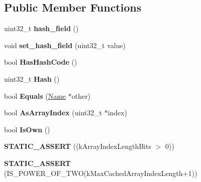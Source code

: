 \subsection*{Public Member Functions}
\begin{DoxyCompactItemize}
\item 
\hypertarget{classv8_1_1internal_1_1_name_ad61608b54af5cb01c5397ad55d911907}{}uint32\+\_\+t {\bfseries hash\+\_\+field} ()\label{classv8_1_1internal_1_1_name_ad61608b54af5cb01c5397ad55d911907}

\item 
\hypertarget{classv8_1_1internal_1_1_name_a7143969e09bd27e1f6a60d50258686dd}{}void {\bfseries set\+\_\+hash\+\_\+field} (uint32\+\_\+t value)\label{classv8_1_1internal_1_1_name_a7143969e09bd27e1f6a60d50258686dd}

\item 
\hypertarget{classv8_1_1internal_1_1_name_a2eee1d6ca54d3b718897f4de1249f1dd}{}bool {\bfseries Has\+Hash\+Code} ()\label{classv8_1_1internal_1_1_name_a2eee1d6ca54d3b718897f4de1249f1dd}

\item 
\hypertarget{classv8_1_1internal_1_1_name_a04a7a8b928966e664ad5788210327e36}{}uint32\+\_\+t {\bfseries Hash} ()\label{classv8_1_1internal_1_1_name_a04a7a8b928966e664ad5788210327e36}

\item 
\hypertarget{classv8_1_1internal_1_1_name_aa375654cad6d51ae37d9ae5b5b358899}{}bool {\bfseries Equals} (\hyperlink{classv8_1_1internal_1_1_name}{Name} $\ast$other)\label{classv8_1_1internal_1_1_name_aa375654cad6d51ae37d9ae5b5b358899}

\item 
\hypertarget{classv8_1_1internal_1_1_name_aafe9fecb286ed29037aecd56eb3f3124}{}bool {\bfseries As\+Array\+Index} (uint32\+\_\+t $\ast$index)\label{classv8_1_1internal_1_1_name_aafe9fecb286ed29037aecd56eb3f3124}

\item 
\hypertarget{classv8_1_1internal_1_1_name_a79a0206aecdc1c1933b3f8ccda71303b}{}bool {\bfseries Is\+Own} ()\label{classv8_1_1internal_1_1_name_a79a0206aecdc1c1933b3f8ccda71303b}

\item 
\hypertarget{classv8_1_1internal_1_1_name_a93e25700aee0fa11ea167996757f771d}{}{\bfseries S\+T\+A\+T\+I\+C\+\_\+\+A\+S\+S\+E\+R\+T} ((k\+Array\+Index\+Length\+Bits $>$ 0))\label{classv8_1_1internal_1_1_name_a93e25700aee0fa11ea167996757f771d}

\item 
\hypertarget{classv8_1_1internal_1_1_name_a39f198a63ff3c994c28811b865151eaa}{}{\bfseries S\+T\+A\+T\+I\+C\+\_\+\+A\+S\+S\+E\+R\+T} (I\+S\+\_\+\+P\+O\+W\+E\+R\+\_\+\+O\+F\+\_\+\+T\+W\+O(k\+Max\+Cached\+Array\+Index\+Length+1))\label{classv8_1_1internal_1_1_name_a39f198a63ff3c994c28811b865151eaa}

\end{DoxyCompactItemize}
